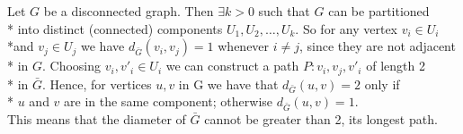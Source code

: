 Let $G$ be a disconnected graph. Then $\exists k > 0$ such that $G$ can be partitioned\\* into distinct (connected) components $U_1, U_2, \dots ,U_k$. So for any vertex $v_i \in U_i$ \\*and $v_j \in U_j$ we have $d_{\bar{G}}\left(v_i, v_j\right) = 1$  whenever $ i \neq j$, since they are not adjacent\\* in $G$. Choosing $v_i , v'_i \in U_i$ we can construct a path $P: v_i, v_j, v'_i$ of length 2\\* in $\bar{G}$. Hence, for vertices $u,v$ in G we have that $d_{\bar{G}}\left(u,v\right) = 2$  only if\\* $u$ and $v$ are in the same component;  otherwise $d_{\bar{G}}\left(u,v\right) = 1$.\\ This means that the diameter of $\bar{G}$ cannot be greater than 2, its longest path.
